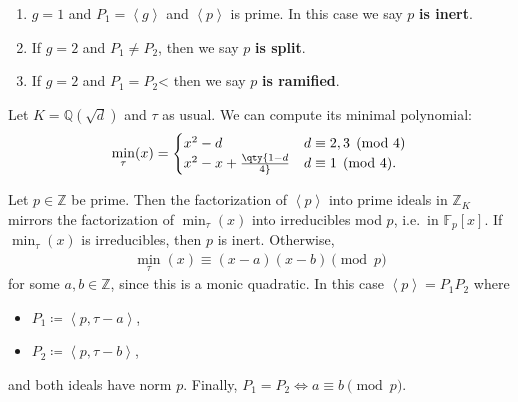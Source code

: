 \begin{remark}
\begin{definition}

\envlist

\begin{enumerate}
\def\labelenumi{\alph{enumi}.}
\item
  \(g=1\) and \(P_1 = \left\langle{ g }\right\rangle\) and
  \(\left\langle{ p }\right\rangle\) is prime. In this case we say \(p\)
  \textbf{is inert}.
\item
  If \(g=2\) and \(P_1 \neq P_2\), then we say \(p\) \textbf{is split}.
\item
  If \(g=2\) and \(P_1 = P_2\)\textless{} then we say \(p\) \textbf{is
  ramified}.
\end{enumerate}

\end{definition}

Let \(K = {\mathbb{Q}}( \sqrt{d} )\) and \(\tau\) as usual. We can
compute its minimal polynomial:
\begin{align*}
\min_\tau(x) = 
\begin{cases}
x^2 - d & d \equiv 2,3 \pmod 4  
\\
x^2 - x + \qty{1-d \over 4} & d \equiv 1 \pmod 4.
\end{cases}
\end{align*}

\end{remark}

\begin{theorem}

Let \(p\in {\mathbb{Z}}\) be prime. Then the factorization of
\(\left\langle{ p }\right\rangle\) into prime ideals in
\({\mathbb{Z}}_K\) mirrors the factorization of \(\min_\tau(x)\) into
irreducibles mod \(p\), i.e.~in \({\mathbb{F}}_p[x]\). If
\(\min_\tau(x)\) is irreducibles, then \(p\) is inert. Otherwise,
\begin{align*}
\min_\tau(x) \equiv (x-a)(x-b) \pmod p
\end{align*}
for some \(a, b\in {\mathbb{Z}}\), since this is a monic quadratic. In
this case \(\left\langle{ p }\right\rangle= P_1 P_2\) where

\begin{itemize}
\tightlist
\item
  \(P_1 \coloneqq\left\langle{ p, \tau - a }\right\rangle\),
\item
  \(P_2 \coloneqq\left\langle{ p, \tau - b}\right\rangle\),
\end{itemize}

and both ideals have norm \(p\). Finally,
\(P_1 = P_2 \iff a\equiv b \pmod p\).

\end{theorem}

